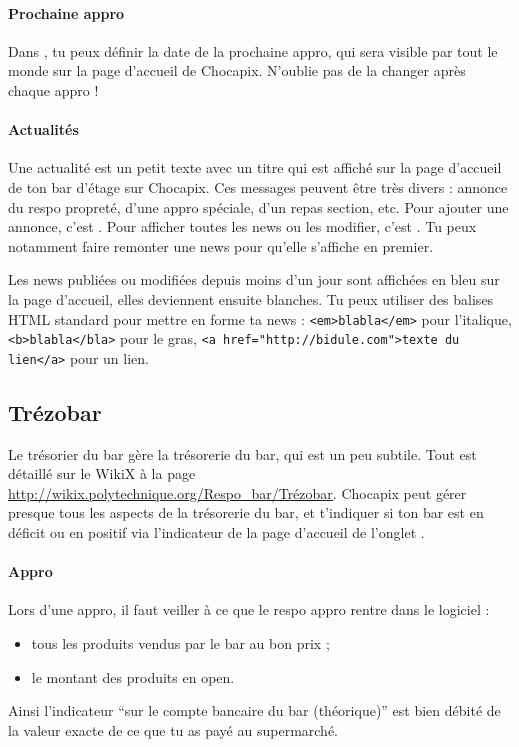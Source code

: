 \documentclass[12pt,french]{article}
\begin{document}
\paragraph{Prochaine appro} Dans , tu peux définir la date de la prochaine appro, qui sera visible par tout le monde sur la page d'accueil de Chocapix. N'oublie pas de la changer après chaque appro !

\paragraph{Actualités} Une actualité est un petit texte avec un titre qui est affiché sur la page d'accueil de ton bar d'étage sur Chocapix. Ces messages peuvent être très divers : annonce du respo propreté, d'une appro spéciale, d'un repas section, etc. Pour ajouter une annonce, c'est . Pour afficher toutes les news ou les modifier, c'est . Tu peux notamment faire remonter une news pour qu'elle s'affiche en premier.

Les news publiées ou modifiées depuis moins d'un jour sont affichées en bleu sur la page d'accueil, elles deviennent ensuite blanches. Tu peux utiliser des balises HTML standard pour mettre en forme ta news : \texttt{<em>blabla</em>} pour l'italique, \texttt{<b>blabla</bla>} pour le gras, \texttt{<a href="http://bidule.com">texte du lien</a>} pour un lien.

\subsection{Trézobar}

Le trésorier du bar gère la trésorerie du bar, qui est un peu subtile. Tout est détaillé sur le WikiX à la page \url{http://wikix.polytechnique.org/Respo_bar/Trézobar}. Chocapix peut gérer presque tous les aspects de la trésorerie du bar, et t'indiquer si ton bar est en déficit ou en positif via l'indicateur de la page d'accueil de l'onglet .

\paragraph{Appro} Lors d'une appro, il faut veiller à ce que le respo appro rentre dans le logiciel :
\begin{itemize}
	\item tous les produits vendus par le bar au bon prix ;
	\item le montant des produits en open.
\end{itemize}
Ainsi l'indicateur \enquote{sur le compte bancaire du bar (théorique)}  est bien débité de la valeur exacte de ce que tu as payé au supermarché.
\end{document}

